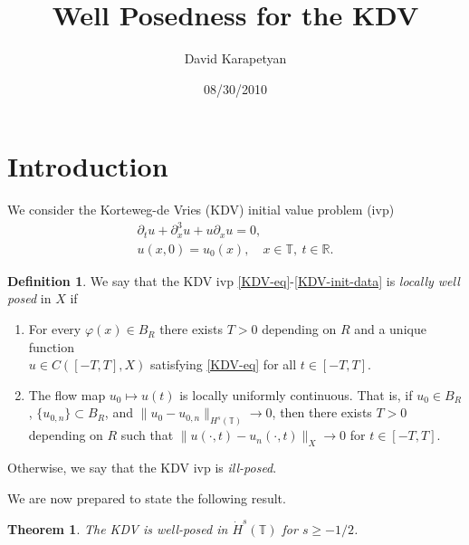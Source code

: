 \documentclass[12pt,reqno]{amsart}
\numberwithin{equation}{section}  %
\numberwithin{figure}{section}
\newcommand{\rr}{\mathbb{R}}
\newcommand{\ci}{\mathbb{T}}
\newcommand{\p}{\partial}
\newcommand{\vp}{\varphi}
\theoremstyle{plain}
\newtheorem{theorem}{Theorem}
\theoremstyle{definition}
\newtheorem{definition}{Definition}
\theoremstyle{remark}
\begin{document}
\title{Well Posedness for the KDV}
\author{David Karapetyan}
\address{Department of Mathematics  \\
         University  of Notre Dame\\
         Notre Dame, IN 46556 }
\date{08/30/2010}
%
\maketitle
%
%
%
%
%
%
\section{Introduction}
We consider the Korteweg-de Vries (KDV) initial value problem (ivp)
%
%
\begin{gather}
	\label{KDV-eq}
	\p_t u + \p_x^{3} u + u \p_x u = 0,
	\\
	\label{KDV-init-data}
	u(x,0) = u_0(x), \quad x \in \ci, \ t \in \rr.
\end{gather}
%
%
%
%
\begin{definition}
	We say that the KDV ivp \eqref{KDV-eq}-\eqref{KDV-init-data} is
	\emph{locally well posed} in
	$X$ if 
	\begin{enumerate}
		\item For every $\vp(x) \in
	B_R$ there exists $T>0$ depending on $R$ and a unique function
	\\
	$u \in C([-T, T],
	X)$ satisfying \eqref{KDV-eq} for all $t \in [-T, T]$. 
\item The flow map $u_0 \mapsto u(t)$ is locally uniformly continuous. That is, if $u_0
	\in B_R$, $\{u_{0,n}\} \subset B_R$, and 
	$\|u_0 - u_{0, n} \|_{H^{s}(\ci)} \to 0$, then there exists $T >0$ depending
	on $R$ such that $\|u(\cdot, t) - u_{n}(\cdot,t) \|_{X} \to
	0$ for $t \in [-T, T]$. 
	\end{enumerate}
	Otherwise, we say that the KDV ivp is \emph{ill-posed}.
\end{definition}
%
%
We are now prepared to state the following result.

%
%
%
%
%
%
\begin{theorem}
	\label{thm:main}
	The KDV is well-posed in $\dot{H}^s(\ci)$ for $s \ge -1/2$.  
\end{theorem}
%
%
%
%
%
%
%
%
\end{document}
